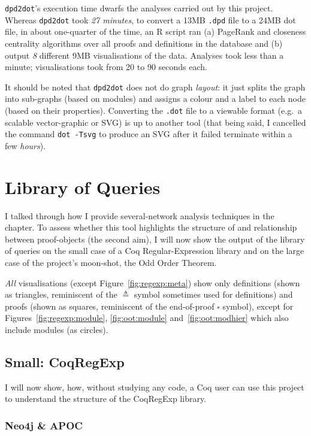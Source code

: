 \texttt{dpd2dot}'s  execution time dwarfs the analyses carried out by this
project. Whereas \texttt{dpd2dot} took \emph{27 minutes}, to convert a 13MB
\texttt{.dpd} file to a 24MB dot file, in about one-quarter of the time, an R
script ran (a) PageRank and closeness centrality algorithms over all proofs and
definitions in the database and (b) output \emph{8} different 9MB visualisations
of the data.  Analyses took less than a minute; visualisations took from 20 to
90 seconds each.

It should be noted that \texttt{dpd2dot} does not do graph \emph{layout}: it
just splits the graph into sub-graphs (based on modules) and assigns a colour
and a label to each node (based on their properties). Converting the
\texttt{.dot} file to a viewable format (e.g.\ a scalable vector-graphic or SVG)
is up to another tool (that being said, I cancelled the command \texttt{dot
-Tsvg} to produce an SVG after it failed terminate within a few \emph{hours}).

\section{Library of Queries}\label{sec:libeval}

I talked through how I provide several-network analysis techniques in
the~ chapter. To assess whether this tool highlights the
structure of and relationship between proof-objects (the second aim), I will now
show the output of the library of queries on the small case of a Coq
Regular-Expression library and on the large case of the project's moon-shot, the
Odd Order Theorem.

\emph{All} visualisations (except Figure~\ref{fig:regexp:meta}) show only
definitions (shown as triangles, reminiscent of the $\triangleq$ symbol
sometimes used for definitions) and proofs (shown as squares, reminiscent of the
end-of-proof $\square$ symbol), except for Figures~\ref{fig:regexp:module},
\ref{fig:oot:module} and~\ref{fig:oot:modhier} which also include modules (as
circles).

\subsection{Small: CoqRegExp}

I will now show, how, without studying any code, a Coq user can use this
project to understand the structure of the CoqRegExp library.

\subsubsection{Neo4j \& APOC}

